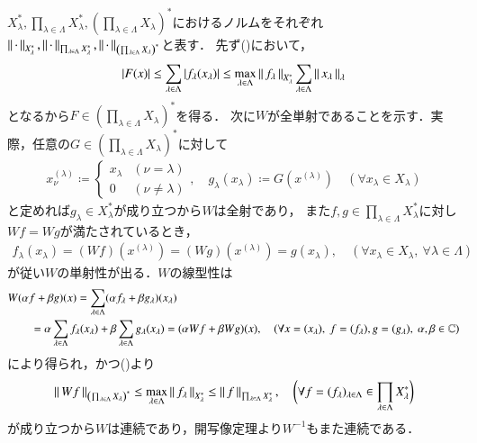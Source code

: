 	\begin{prf}
		$X_\lambda^*,\prod_{\lambda \in \Lambda} X_\lambda^*,\left( \prod_{\lambda \in \Lambda} X_\lambda \right)^*$におけるノルムをそれぞれ
		$\left\|\, \cdot\, \right\|_{X_\lambda^*},\left\|\, \cdot\, \right\|_{\prod_{\lambda \in \Lambda} X_\lambda^*},\left\|\, \cdot\, \right\|_{\left( \prod_{\lambda \in \Lambda} X_\lambda \right)^*}$と表す．
		先ず()において，
		\begin{align}
			|F(x)| \leq \sum_{\lambda \in \Lambda} |f_\lambda(x_\lambda)|
			\leq \operatorname*{max}_{\lambda \in \Lambda} \left\|\, f_\lambda\, \right\|_{X_\lambda^*} \sum_{\lambda \in \Lambda} \left\|\, x_\lambda\, \right\|_{\lambda}
			\label{eq:lem_isomorphism_on_product_of_dual_spaces_2}
		\end{align}
		となるから$F \in \left( \prod_{\lambda \in \Lambda} X_\lambda \right)^*$を得る．
		次に$W$が全単射であることを示す．実際，任意の$G \in \left( \prod_{\lambda \in \Lambda} X_\lambda \right)^*$に対して
		\begin{align}
			x^{(\lambda)}_\nu \coloneqq 
			\begin{cases}
				x_\lambda & (\nu = \lambda) \\
				0 & (\nu \neq \lambda)
			\end{cases},
			\quad g_\lambda(x_\lambda) \coloneqq G(x^{(\lambda)})
			\quad (\forall x_\lambda \in X_\lambda)
		\end{align}
		と定めれば$g_\lambda \in X_\lambda^*$が成り立つから$W$は全射であり，
		また$f,g \in \prod_{\lambda \in \Lambda} X_\lambda^*$に対し$Wf = Wg$が満たされているとき，
		\begin{align}
			f_\lambda(x_\lambda) = (Wf)(x^{(\lambda)})
			= (Wg)(x^{(\lambda)}) = g(x_\lambda),
			\quad (\forall x_\lambda \in X_\lambda,\ \forall \lambda \in \Lambda)
		\end{align}
		が従い$W$の単射性が出る．$W$の線型性は
		\begin{align}
			&W(\alpha f + \beta g)(x)
			= \sum_{\lambda \in \Lambda} (\alpha f_\lambda + \beta g_\lambda) (x_\lambda) \\
			&\qquad = \alpha \sum_{\lambda \in \Lambda} f_\lambda(x_\lambda)
				+ \beta \sum_{\lambda \in \Lambda} g_\lambda(x_\lambda)
			= (\alpha W f + \beta W g)(x),
			\quad (\forall x=(x_\lambda),\ f=(f_\lambda),g=(g_\lambda),\ \alpha,\beta \in \C)
		\end{align}
		により得られ，かつ()より
		\begin{align}
			\left\|\, Wf\, \right\|_{\left( \prod_{\lambda \in \Lambda} X_\lambda \right)^*}
			\leq \operatorname*{max}_{\lambda \in \Lambda} \left\|\, f_\lambda\, \right\|_{X_\lambda^*}
			\leq \left\|\, f\, \right\|_{\prod_{\lambda \in \Lambda} X_\lambda^*},
			\quad \biggl( \forall f = (f_\lambda)_{\lambda \in \Lambda} \in \prod_{\lambda \in \Lambda} X_\lambda^* \biggr)
		\end{align}
		が成り立つから$W$は連続であり，開写像定理より$W^{-1}$もまた連続である．
		\QED
	\end{prf}
	
